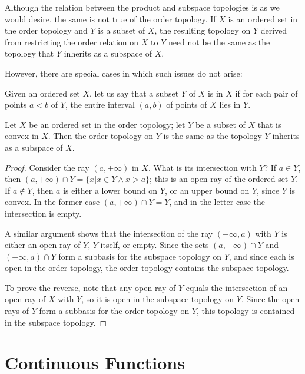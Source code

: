 \documentclass[12pt, a4paper, oneside, openright, titlepage]{book}
\begin{document}
Although the relation between the product and subspace topologies is as we would desire, the same is not true of the order topology. If $X$ is an ordered set in the order topology and $Y$ is a subset of $X$, the resulting topology on $Y$ derived from restricting the order relation on $X$ to $Y$ need not be the same as the topology that $Y$ inherits as a subspace of $X$.

However, there are special cases in which such issues do not arise:

\begin{definition}
    Given an ordered set $X$, let us say that a subset $Y$ of $X$ is  in $X$ if for each pair of points $a < b$ of $Y$, the entire interval $(a,b)$ of points of $X$ lies in $Y$.
\end{definition}

\begin{theorem}
    Let $X$ be an ordered set in the order topology; let $Y$ be a subset of $X$ that is convex in $X$. Then the order topology on $Y$ is the same as the topology $Y$ inherits as a subspace of $X$.
\end{theorem}
\begin{proof}
    Consider the ray $(a,+\infty)$ in $X$. What is its intersection with $Y$? If $a \in Y$, then $(a,+\infty)\cap Y = \{x\vert x \in Y\wedge x>a\}$; this is an open ray of the ordered set $Y$. If $a \notin Y$, then $a$ is either a lower bound on $Y$, or an upper bound on $Y$, since $Y$ is convex. In the former case $(a,+\infty)\cap Y = Y$, and in the letter case the intersection is empty.

    A similar argument shows that the intersection of the ray $(-\infty,a)$ with $Y$ is either an open ray of $Y$, $Y$ itself, or empty. Since the sets $(a,+\infty)\cap Y$ and $(-\infty,a)\cap Y$ form a subbasis for the subspace topology on $Y$, and since each is open in the order topology, the order topology contains the subspace topology.

    To prove the reverse, note that any open ray of $Y$ equals the intersection of an open ray of $X$ with $Y$, so it is open in the subspace topology on $Y$. Since the open rays of $Y$ form a subbasis for the order topology on $Y$, this topology is contained in the subspace topology.
\end{proof}




\section{Continuous Functions}
\end{document}
